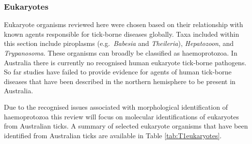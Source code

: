\documentclass[a4paper, nobind]{templates/ociamthesis}
\begin{document}
\endgroup{}

\hypertarget{eukaryotes-1}{%
\subsubsection{Eukaryotes}\label{eukaryotes-1}}

Eukaryote organisms reviewed here were chosen based on their relationship with known agents responsible for tick-borne diseases globally.
Taxa included within this section include piroplasms (e.g.~\emph{Babesia} and \emph{Theileria}), \emph{Hepatozoon}, and \emph{Trypanosoma}.
These organisms can broadly be classified as haemoprotozoa.
In Australia there is currently no recognised human eukaryote tick-borne pathogens.
So far studies have failed to provide evidence for agents of human tick-borne diseases that have been described in the northern hemisphere to be present in Australia.

Due to the recognised issues associated with morphological identification of haemoprotozoa \autocite{zhuLooksCanDeceive2009,lackPhylogenyEvolutionPiroplasmida2012,kostygovEuglenozoaTaxonomyDiversity2021} this review will focus on molecular identifications of eukaryotes from Australian ticks.
A summary of selected eukaryote organisms that have been identified from Australian ticks are available in Table \ref{tab:T1eukaryotes}.

\begingroup\fontsize{8}{10}\selectfont
\end{document}
